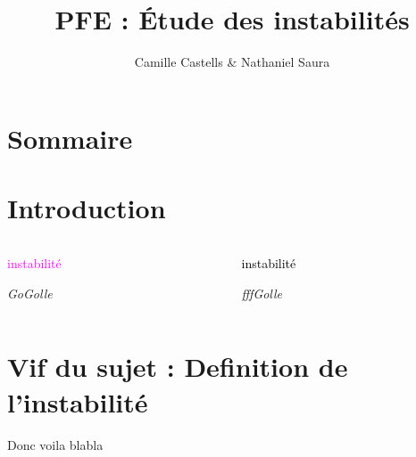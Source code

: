 \documentclass{beamer}
\title{PFE : Étude des instabilités }
\author{Camille Castells \& Nathaniel Saura}
\begin{document}
\begin{frame}
 \titlepage
\end{frame}

\section*{Sommaire}
\begin{frame}
 \tableofcontents
\end{frame}

\section{Introduction}
\begin{frame}
  \begin{columns}[t]
    \begin{column}{5cm}
    {\textcolor{magenta}{instabilité}} \\
     
     \begin{center}
      \textit{GoGolle}
     \end{center}

    \end{column}

    \begin{column}{5cm}
      {\textcolor{black}{instabilité}} \\
     
     \begin{center}
      \textit{fffGolle}
     \end{center}

    \end{column}
    
  \end{columns}
 
\end{frame}

\section{Vif du sujet : Definition de l'instabilité}
\begin{frame}
 Donc voila blabla
\end{frame}
\end{document}
